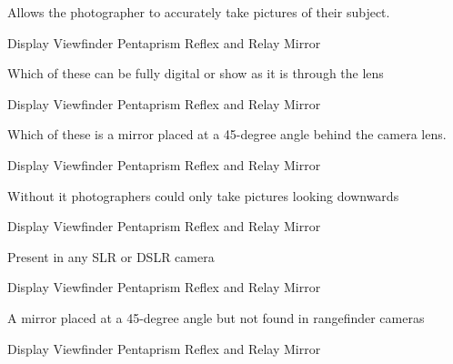 \documentclass[theme=sleek, randomorder, hidesidemenu]{webquiz}
\begin{document}
\begin{question}
  Allows the photographer to accurately take pictures of their subject.
  \begin{choice}[columns=2]
    \incorrect Display
    \correct Viewfinder
    \incorrect Pentaprism
    \incorrect Reflex and Relay Mirror
  \end{choice}
\end{question}

\begin{question}
  Which of these can be fully digital or show as it is through the lens
  \begin{choice}[columns=2]
    \incorrect Display
    \correct Viewfinder
    \incorrect Pentaprism
    \incorrect Reflex and Relay Mirror
  \end{choice}
\end{question}

\begin{question}
  Which of these is a mirror placed at a 45-degree angle behind the camera lens.
  \begin{choice}[columns=2]
    \incorrect Display
    \incorrect Viewfinder
    \correct Pentaprism
    \incorrect Reflex and Relay Mirror
  \end{choice}
\end{question}

\begin{question}
  Without it photographers could only take pictures looking downwards
  \begin{choice}[columns=2]
    \incorrect Display
    \incorrect Viewfinder
    \correct Pentaprism
    \incorrect Reflex and Relay Mirror
  \end{choice}
\end{question}

\begin{question}
  Present in any SLR or DSLR camera
  \begin{choice}[columns=2]
    \incorrect Display
    \incorrect Viewfinder
    \incorrect Pentaprism
    \correct Reflex and Relay Mirror
  \end{choice}
\end{question}

\begin{question}
  A mirror placed at a 45-degree angle but not found in rangefinder cameras
  \begin{choice}[columns=2]
    \incorrect Display
    \incorrect Viewfinder
    \incorrect Pentaprism
    \correct Reflex and Relay Mirror
  \end{choice}
\end{question}
\end{document}
